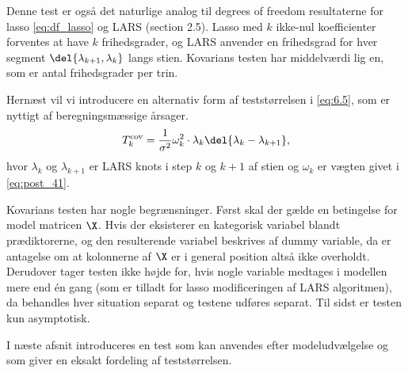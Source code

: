 Denne test er også det naturlige analog til degrees of freedom resultaterne for lasso \eqref{eq:df_lasso} og LARS (section 2.5).
Lasso med \(k\) ikke-nul koefficienter forventes at have \(k\) frihedsgrader, og LARS anvender en frihedsgrad for hver segment \(\del{\lambda_{k+1}, \lambda_k}\) langs stien.
Kovarians testen har middelværdi lig en, som er antal frihedsgrader per trin.
%

Hernæst vil vi introducere en alternativ form af teststørrelsen i \eqref{eq:6.5}, som er nyttigt af beregningsmæssige årsager.
\begin{align*}
T_k^\text{cov} = \frac{1}{\sigma^2} \omega_k^2 \cdot \lambda_k \del{\lambda_k - \lambda_{k+1}},
\end{align*}
hvor \(\lambda_k\) og \(\lambda_{k+1}\) er LARS knots i step \(k\) og \(k+1\) af stien og \(\omega_k\) er vægten givet i \eqref{eq:post_41}.





Kovarians testen har nogle begrænsninger.
Først skal der gælde en betingelse for model matricen \(\X\).
Hvis der eksisterer en kategorisk variabel blandt prædiktorerne, og den resulterende variabel beskrives af dummy variable, da er antagelse om at kolonnerne af \(\X\) er i general position altså ikke overholdt.
Derudover tager testen ikke højde for, hvis nogle variable medtages i modellen mere end én gang (som er tilladt for lasso modificeringen af LARS algoritmen), da behandles hver situation separat og testene udføres separat.
Til sidst er testen kun asymptotisk.

I næste afsnit introduceres en test som kan anvendes efter modeludvælgelse og som giver en eksakt fordeling af teststørrelsen.